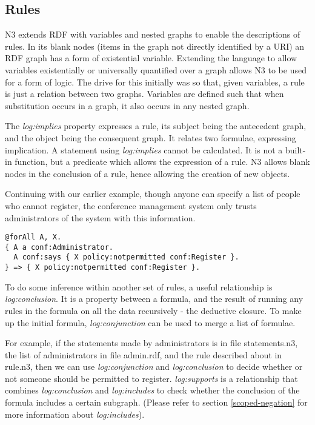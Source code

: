 \documentclass{tlp}
\begin{document}
\subsection{Rules} 
\label{rules}

N3 extends RDF with variables and nested graphs to enable the
descriptions of rules. In its blank nodes (items in the graph not
directly identified by a URI) an RDF graph has a form of existential
variable. Extending the language to allow variables existentially or
universally quantified over a graph allows N3 to be used for a form of
logic. The drive for this initially was so that, given variables, a
rule is just a relation between two graphs. Variables are defined such
that when substitution occurs in a graph, it also occurs in any nested
graph. 

The {\it log:implies} property expresses a rule, its subject being the
antecedent graph, and the object being the consequent graph. It
relates two formulae, expressing implication. A statement using {\it
  log:implies} cannot be calculated.  It is not a built-in function,
but a predicate which allows the expression of a rule.  N3 allows
blank nodes in the conclusion of a rule, hence allowing the creation
of new objects.

Continuing with our earlier example, though anyone can specify a list
of people who cannot register, the conference management system only
trusts administrators of the system with this information.

\begin{verbatim}
@forAll A, X. 
{ A a conf:Administrator.
  A conf:says { X policy:notpermitted conf:Register }.
} => { X policy:notpermitted conf:Register }.
\end{verbatim}

To do some inference within another set of rules, a useful
relationship is {\it log:conclusion}. It is a property between a
formula, and the result of running any rules in the formula on all the
data recursively - the deductive closure. To make up the initial
formula, {\it log:conjunction} can be used to merge a list of
formulae.

For example, if the statements made by administrators is in file
statements.n3, the list of administrators in file
admin.rdf, and the rule described about in rule.n3, then
we can use {\it log:conjunction} and {\it log:conclusion} to decide
whether or not someone should be permitted to register.  {\it
  log:supports} is a relationship that combines {\it log:conclusion}
and {\it log:includes} to check whether the conclusion of the formula
includes a certain subgraph. (Please refer to section
\ref{scoped-negation} for more information about {\it log:includes}).
\end{document}
